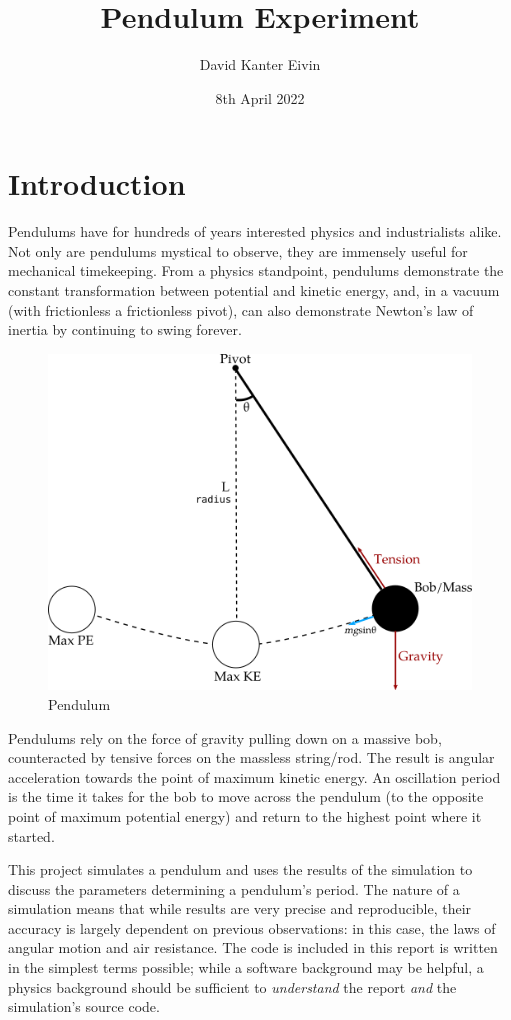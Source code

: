 \documentclass[12pt,a4paper]{article}
\title{ Pendulum Experiment }
\author{ David Kanter Eivin }
\date{ 8th April 2022 }
\begin{document}
\maketitle


\section{Introduction}
Pendulums have for hundreds of years interested physics and industrialists alike. Not only are pendulums mystical to observe, they are immensely useful for mechanical timekeeping. From a physics standpoint, pendulums demonstrate the constant transformation between potential and kinetic energy, and, in a vacuum (with frictionless a frictionless pivot), can also demonstrate Newton's law of inertia by continuing to swing forever.

\begin{figure}
\centering
\includegraphics{pendulum.png}
\caption{Pendulum}
\end{figure}


Pendulums rely on the force of gravity pulling down on a massive bob, counteracted by tensive forces on the massless string/rod. The result is angular acceleration towards the point of maximum kinetic energy. An oscillation period is the time it takes for the bob to move across the pendulum (to the opposite point of maximum potential energy) and return to the highest point where it started.

This project simulates a pendulum and uses the results of the simulation to discuss the parameters determining a pendulum's period. The nature of a simulation means that while results are very precise and reproducible, their accuracy is largely dependent on previous observations: in this case, the laws of angular motion and air resistance. The code is included in this report is written in the simplest terms possible; while a software background may be helpful, a physics background should be sufficient to \emph{understand} the report \emph{and} the simulation's source code.
\end{document}

